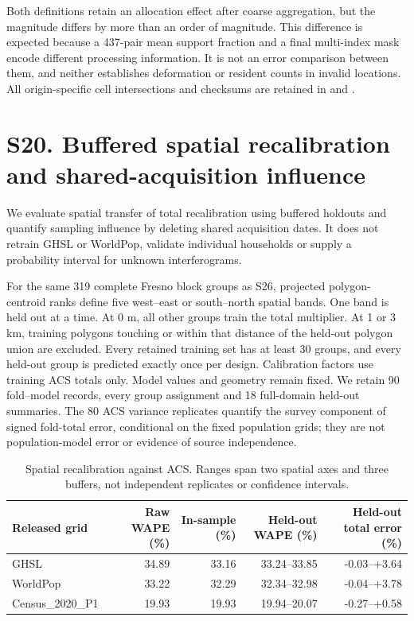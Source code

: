 \documentclass[10pt,a4paper]{article}
\begin{document}
Both definitions retain an allocation effect after coarse aggregation, but the magnitude differs by more than an order of magnitude. This difference is expected because a 437-pair mean support fraction and a final multi-index mask encode different processing information. It is not an error comparison between them, and neither establishes deformation or resident counts in invalid locations. All origin-specific cell intersections and checksums are retained in  and .


\section*{S20. Buffered spatial recalibration and shared-acquisition influence}
We evaluate spatial transfer of total recalibration using buffered holdouts and quantify sampling influence by deleting shared acquisition dates. It does not retrain GHSL or WorldPop, validate individual households or supply a probability interval for unknown interferograms.

For the same 319 complete Fresno block groups as S26, projected polygon-centroid ranks define five west--east or south--north spatial bands. One band is held out at a time. At 0 m, all other groups train the total multiplier. At 1 or 3 km, training polygons touching or within that distance of the held-out polygon union are excluded. Every retained training set has at least 30 groups, and every held-out group is predicted exactly once per design. Calibration factors use training ACS totals only. Model values and geometry remain fixed. We retain 90 fold--model records, every group assignment and 18 full-domain held-out summaries. The 80 ACS variance replicates quantify the survey component of signed fold-total error, conditional on the fixed population grids; they are not population-model error or evidence of source independence.
\begin{table}[htbp]\centering\small
\caption{Spatial recalibration against ACS. Ranges span two spatial axes and three buffers, not independent replicates or confidence intervals.}
\begin{tabular}{lrrrr}\toprule
Released grid & Raw WAPE (\%) & In-sample (\%) & Held-out WAPE (\%) & Held-out total error (\%) \\\midrule
GHSL & 34.89 & 33.16 & 33.24--33.85 & -0.03--+3.64 \\
WorldPop & 33.22 & 32.29 & 32.34--32.98 & -0.04--+3.78 \\
Census\_2020\_P1 & 19.93 & 19.93 & 19.94--20.07 & -0.27--+0.58 \\
\bottomrule\end{tabular}
\end{table}
\end{document}
